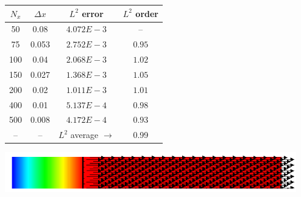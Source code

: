 \documentclass{beamer}
\begin{document}
\begin{frame}
\begin{columns}
\begin{column}{0.5 \textwidth}
\begin{table}
	\tiny
		\begin{tabular}{|c|c||cc|}
			\hline
			$N_x$ & $\Delta x$ & $L^2$ error & $L^2$ order \\
			\hline
			\hline
			50 	& 0.08  & $4.072E-3$ & --  \\
			75  & 0.053 & $2.752E-3$ & $0.95$  \\
			100 & 0.04  & $2.068E-3$ & $1.02$   \\
			150 & 0.027 & $1.368E-3$ & $1.05$   \\
			200 & 0.02  & $1.011E-3$ & $1.01$   \\
			400 & 0.01  & $5.137E-4$ & $0.98$   \\
			500 & 0.008 & $4.172E-4$ & $0.93$  \\
			\hline
			-- & --     &  $L^2$ average  $\rightarrow$ & 0.99 \\
			\hline
		\end{tabular}
\end{table}
\includegraphics[width=1\textwidth]{Figures/avantApresRhoDiff0000.png}
\end{column}
    \begin{column}{0.5 \textwidth}
		\
		\begin{tikzpicture}[scale = 0.6, every node/.style={scale=0.6}]
			
		\end{tikzpicture}


   \end{column}
   \end{columns}


\end{frame}
\end{document}
